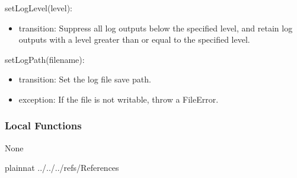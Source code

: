 \documentclass[12pt, titlepage]{article}
\begin{document}
\noindent setLogLevel(level):
\begin{itemize}
\item transition: Suppress all log outputs below the specified level, and retain
log outputs with a level greater than or equal to the specified level.
\end{itemize}

\noindent setLogPath(filename):
\begin{itemize}
\item transition: Set the log file save path.
\item exception: If the file is not writable, throw a FileError.
\end{itemize}

\subsubsection{Local Functions}

None

\newpage

 {plainnat}
 {../../../refs/References}



\end{document}
